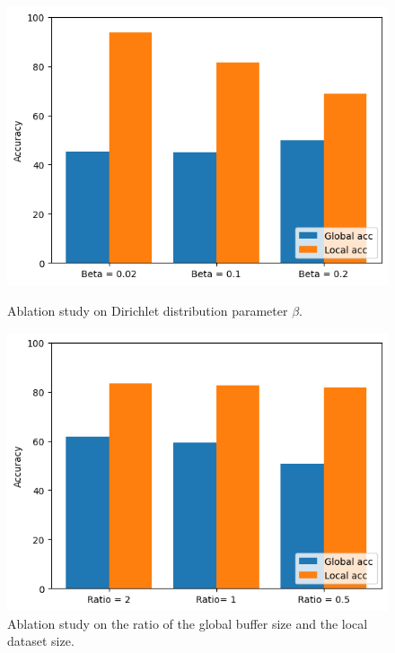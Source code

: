\begin{figure}
\begin{minipage}[t]{0.3\textwidth}
  \includegraphics[width=\linewidth]{ab_study_1.png}
  \caption{Ablation study on Dirichlet distribution parameter $\beta$.}
  \label{fig:first}
\end{minipage}%
\hfill %
\begin{minipage}[t]{0.3\textwidth}
  \includegraphics[width=\linewidth]{ab_study_2.png}
  \caption{Ablation study on the ratio of the global buffer size and the local dataset size.}
  \label{fig:second}
\end{minipage}%
\hfill
\begin{minipage}[t]{0.3\textwidth}

\end{minipage}
\end{figure}
